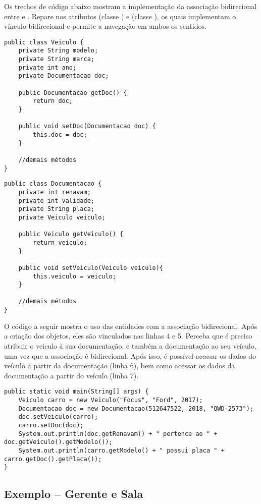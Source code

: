 Os trechos de código abaixo mostram a implementação da associação bidirecional entre  e . Repare nos atributos  (classe ) e  (classe ), os quais implementam o vínculo bidirecional e permite a navegação em ambos os sentidos.

 \begin{verbatim}
public class Veiculo {
	private String modelo;
	private String marca;
	private int ano;
	private Documentacao doc;
	
	public Documentacao getDoc() {
		return doc;
	}
	
	public void setDoc(Documentacao doc) {
		this.doc = doc;
	}
	
	//demais métodos
}
\end{verbatim}

\begin{verbatim}
public class Documentacao {
	private int renavam;
	private int validade;
	private String placa;
	private Veiculo veiculo;
	
	public Veiculo getVeiculo() {
		return veiculo;
	}
	
	public void setVeiculo(Veiculo veiculo){
		this.veiculo = veiculo;
	}
	
	//demais métodos
}
\end{verbatim}

O código a seguir mostra o uso das entidades com a associação bidirecional. Após a criação dos objetos, eles são vinculados nas linhas 4 e 5. Perceba que é preciso atribuir o veículo à sua documentação, e também a documentação ao seu veículo, uma vez que a associação é bidirecional. Após isso, é possível acessar os dados do veículo a partir da documentação (linha 6), bem como acessar os dados da documentação a partir do veículo (linha 7).

\begin{verbatim}
public static void main(String[] args) {
	Veiculo carro = new Veiculo("Focus", "Ford", 2017);
	Documentacao doc = new Documentacao(512647522, 2018, "QWD-2573");
	doc.setVeiculo(carro);
	carro.setDoc(doc);
	System.out.println(doc.getRenavam() + " pertence ao " + doc.getVeiculo().getModelo());
	System.out.println(carro.getModelo() + " possui placa " + carro.getDoc().getPlaca());
}
\end{verbatim}

 
\subsection{Exemplo -- Gerente e Sala}
 
